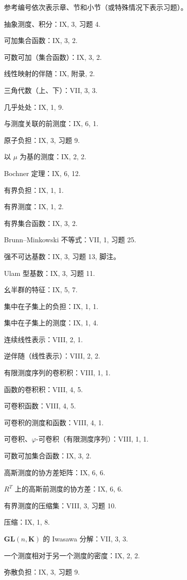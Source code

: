 
参考编号依次表示章、节和小节（或特殊情况下表示习题）。

抽象测度、积分：IX, 3, 习题 4.

可加集合函数：IX, 3, 2.

可数可加（集合函数）：IX, 3, 2.

线性映射的伴随：IX, 附录, 2.

三角代数（上、下）：VII, 3, 3.

几乎处处：IX, 1, 9.

与测度关联的前测度：IX, 6, 1.

原子负担：IX, 3, 习题 9.

以 \(\mu\) 为基的测度：IX, 2, 2.

Bochner 定理：IX, 6, 12.

有界负担：IX, 1, 1.

有界测度：IX, 1, 2.

有界集合函数：IX, 3, 2.

Brunn--Minkowski 不等式：VII, 1, 习题 25.

强不可达基数：IX, 3, 习题 13, 脚注。

Ulam 型基数：IX, 3, 习题 11.

幺半群的特征：IX, 5, 7.

集中在子集上的负担：IX, 1, 1.

集中在子集上的测度：IX, 1, 4.

连续线性表示：VIII, 2, 1.

逆伴随（线性表示）：VIII, 2, 2.

有限测度序列的卷积积：VIII, 1, 1.

函数的卷积积：VIII, 4, 5.

可卷积函数：VIII, 4, 5.

可卷积的测度和函数：VIII, 4, 1.

可卷积、\(\varphi\)-可卷积（有限测度序列）：VIII, 1, 1.

可数可加集合函数：IX, 3, 2.

高斯测度的协方差矩阵：IX, 6, 6.

\(R^{T}\) 上的高斯前测度的协方差：IX, 6, 6.

有界测度的压缩集：VIII, 3, 习题 10.

压缩：IX, 1, 8.

\(\mathbf{GL}(n,\mathbf{K})\) 的 Iwasawa 分解：VII, 3, 3.

一个测度相对于另一个测度的密度：IX, 2, 2.

弥散负担：IX, 3, 习题 9.

